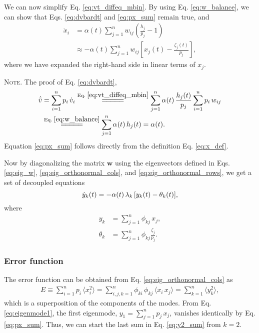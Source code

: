 \documentclass[reprint, floatfix]{revtex4-1}
\newcommand{\note}[1]{{\color{DarkGreen}\footnotesize \textsc{Note.} #1}}
\newcommand{\Err}{E}
\begin{document}
We can now simplify Eq. \eqref{eq:vt_diffeq_mbin}.
%
By using Eq. \eqref{eq:w_balance},
we can show that
Eqs. \eqref{eq:dvbardt} and \eqref{eq:px_sum}
remain true, and
%
$$
\begin{aligned}
\dot x_i
&= \alpha(t) \sum_{j=1}^n w_{ij}
\left( \frac{ h_j } { p_j }  - 1 \right)
\\
&\approx
-\alpha(t) \sum_{j = 1}^n
w_{ij} \left[ x_j(t) - \frac{\zeta_j (t)}{p_j} \right],
\end{aligned}
$$
where
we have expanded the right-hand side
in linear terms of $x_j$.

\note{The proof of Eq. \eqref{eq:dvbardt},
$$
\begin{aligned}
  \dot{ \bar v }
  &=
  \sum_{i = 1}^n p_i \, \dot v_i
  \stackrel{\mathrm{Eq.\; \eqref{eq:vt_diffeq_mbin}}}
  {=\joinrel=\joinrel=\joinrel=\joinrel=}
  \sum_{j = 1}^n \alpha(t) \, \frac{ h_j(t) } { p_j }
                 \sum_{ i = 1 }^{n} p_i \, w_{ij}
  \\
  &
  \stackrel{\mathrm{Eq.\; \eqref{eq:w_balance}}}
  {=\joinrel=\joinrel=\joinrel=\joinrel=}
  \sum_{j = 1}^n \alpha(t) \, h_j(t)
  =
  \alpha(t).
\end{aligned}
$$
Equation \eqref{eq:px_sum} follows directly from the definition
Eq. \eqref{eq:x_def}.
}

Now by diagonalizing the matrix $\mathbf w$
using the eigenvectors defined in Eqs. \eqref{eq:eig_w},
\eqref{eq:eig_orthonormal_cols},
and
\eqref{eq:eig_orthonormal_rows},
we get a set of decoupled equations
%
\begin{equation}
\dot y_k(t)
=
-\alpha(t) \, \lambda_k \, [y_k(t) - \theta_k(t)],
\notag
\end{equation}
%
where
\begin{align}
  y_k &= \sum_{j=1}^n \phi_{kj} \, x_j,
  \label{eq:y_def}
  \\
  \theta_k &= \sum_{j=1}^n \phi_{kj} \frac{ \zeta_j}{ p_j}.
  \label{eq:eta_def}
\end{align}



\subsubsection{Error function}



The error function can be obtained
from Eq. \eqref{eq:eig_orthonormal_cols}
as
\begin{align}
  \Err
  \equiv
  \sum_{i = 1}^n p_i \,
                 \langle x_i^2 \rangle
  =
  \sum_{i, j, k=1}^n \phi_{ki} \, \phi_{kj} \,
                     \langle x_i \, x_j \rangle
  =
  \sum_{k = 1}^n \langle y_k^2 \rangle,
  \label{eq:y2_sum}
\end{align}
%
which is a superposition of the components of the modes.
%
From Eq. \eqref{eq:eigenmode1},
the first eigenmode, $y_1 = \sum_{j=1}^n p_j \, x_j$,
vanishes identically by Eq. \eqref{eq:px_sum}.
%
Thus, we can start the last sum in Eq. \eqref{eq:y2_sum}
from $k = 2$.
\end{document}

